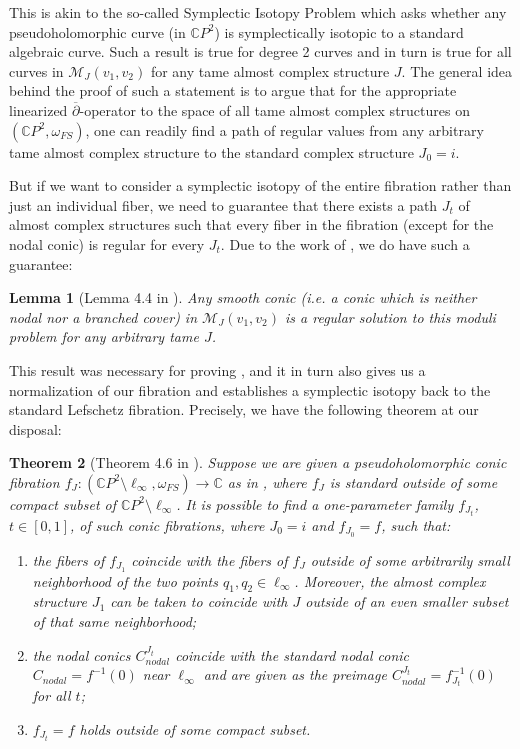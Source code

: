 \documentclass[10pt]{amsart}
\theoremstyle{plain}
\newtheorem{thm}{Theorem}[section]
\newtheorem{lemma}[thm]{Lemma}
\theoremstyle{definition}
\numberwithin{equation}{section}
\newcommand{\C}{\mathbb{C}}
\newcommand{\sm}{\setminus}
\begin{document}
This is akin to the so-called Symplectic Isotopy Problem which asks whether any pseudoholomorphic curve (in $\C P^2$) is symplectically isotopic to a standard algebraic curve. Such a result is true for degree 2 curves \cite{Gromov85_PseudoholCurves} and in turn is true for all curves in $\mathcal{M}_J(v_1,v_2)$ for any tame almost complex structure $J$. The general idea behind the proof of such a statement is to argue that for the appropriate linearized $\overline{\partial}$-operator to the space of all tame almost complex structures on $(\C P^2, \omega_{FS})$, one can readily find a path of regular values from any arbitrary tame almost complex structure to the standard complex structure $J_0=i$.

But if we want to consider a symplectic isotopy of the entire fibration rather than just an individual fiber, we need to guarantee that there exists a path $J_t$ of almost complex structures such that every fiber in the fibration (except for the nodal conic) is regular for every $J_t$. Due to the work of \cite{DR19_WhitneySphere}, we do have such a guarantee:

\begin{lemma}[Lemma 4.4 in \cite{DR19_WhitneySphere}]\label{lem:DR19_lem4.4} Any smooth conic (i.e. a conic which is neither nodal nor a branched cover) in $\mathcal{M}_J(v_1,v_2)$ is a regular solution to this moduli problem for any arbitrary tame $J$.
\end{lemma}

This result was necessary for proving , and it in turn also gives us a normalization of our fibration and establishes a symplectic isotopy back to the standard Lefschetz fibration. Precisely, we have the following theorem at our disposal:

\begin{thm}[Theorem 4.6 in \cite{DR19_WhitneySphere}]\label{thm:DRnormalizedfibr}
Suppose we are given a pseudoholomorphic conic fibration $f_J:(\C P^2\sm\ell_\infty,\omega_{FS})\to \C$ as in , where $f_J$ is standard outside of some compact subset of $\C P^2\sm\ell_\infty$. It is possible to find a one-parameter family $f_{J_t}$, $t\in[0,1]$, of such conic fibrations, where $J_0=i$ and $f_{J_0}=f$, such that:
\begin{enumerate}
\item the fibers of $f_{J_1}$ coincide with the fibers of $f_J$ outside of some arbitrarily small neighborhood of the two points $q_1,q_2\in \ell_\infty$. Moreover, the almost complex structure $J_1$ can be taken to coincide with $J$ outside of an even smaller subset of that same neighborhood;
\item the nodal conics $C_{nodal}^{J_t}$ coincide with the standard nodal conic $C_{nodal}=f^{-1}(0)$ near $\ell_\infty$ and are given as the preimage $C_{nodal}^{J_t}=f_{J_t}^{-1}(0)$ for all $t$;
\item $f_{J_t}=f$ holds outside of some compact subset.
\end{enumerate}
\end{thm}
\end{document}
